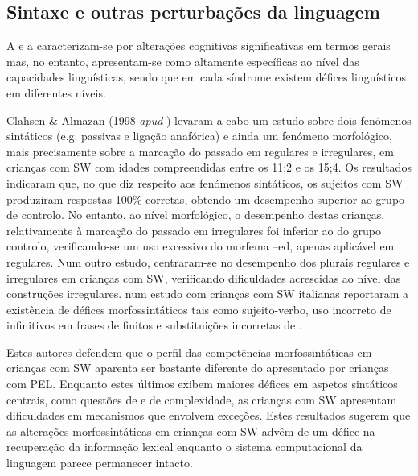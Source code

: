 \documentclass[output=paper]{LSP/langsci}
\begin{document}
\subsection{Sintaxe e outras perturbações da linguagem}
\label{subsec:martins_sintaxe_outras}

A  e a  caracterizam-se por alterações cognitivas significativas em termos gerais mas, no entanto, apresentam-se como altamente específicas ao nível das capacidades linguísticas, sendo que em cada síndrome existem défices linguísticos em diferentes níveis.

Clahsen \& Almazan (1998 \textit{apud} \citealt{guasti2002}) levaram a cabo um estudo sobre dois fenómenos sintáticos (e.g. passivas e ligação anafórica) e ainda um fenómeno morfológico, mais precisamente sobre a marcação do passado em  regulares e irregulares, em crianças com SW com idades compreendidas entre os 11;2 e os 15;4. Os resultados indicaram que, no que diz respeito aos fenómenos sintáticos, os sujeitos com SW produziram respostas 100\% corretas, obtendo um desempenho superior ao grupo de controlo. No entanto, ao nível morfológico, o desempenho destas crianças, relativamente à marcação do passado em  irregulares foi inferior ao do grupo controlo, verificando-se um uso excessivo do morfema –ed, apenas aplicável em  regulares. Num outro estudo, \cite{clahsenalmazan2001} centraram-se no desempenho dos plurais regulares e irregulares em crianças com SW, verificando dificuldades acrescidas ao nível das construções irregulares. \cite{volterra_etal1996} num estudo com crianças com SW italianas reportaram a existência de défices morfossintáticos tais como  sujeito-verbo, uso incorreto de infinitivos em frases de  finitos e substituições incorretas de .

Estes autores defendem que o perfil das competências morfossintáticas em crianças com SW aparenta ser bastante diferente do apresentado por crianças com PEL. Enquanto estes últimos exibem maiores défices em aspetos sintáticos centrais, como questões de  e de complexidade, as crianças com SW apresentam dificuldades em mecanismos que envolvem exceções. Estes resultados sugerem que as alterações morfossintáticas em crianças com SW advêm de um défice na recuperação da informação lexical enquanto o sistema computacional da linguagem parece permanecer intacto.
\end{document}
